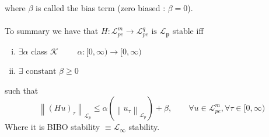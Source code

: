 \documentclass{article}
\begin{document}
where $\beta $ is called the bias term (zero biased : $\beta = 0$).
\\\\
To summary we have that $H : \mathcal{L}_{pe}^{m} \to \mathcal{L}_{pe}^{q} \text{ is } \mathbf{\mathcal{L}_p}$ stable iff 
\begin{enumerate}[i)]
	\item $\exists \alpha $ class $\mathcal{K}$ $\qquad \alpha : [0, \infty) \to [0, \infty) $
	\item $\exists \text{ constant } \beta  \geq 0$  
\end{enumerate} 
such that
\begin{equation}
	\left\| (Hu)_\tau  \right\|_{\mathcal{L}_p} \leq \alpha (\left\| u_\tau  \right\|_{\mathcal{L}_p}) + \beta, \qquad \forall u \in \mathcal{L}_{pe}^{m}, \forall \tau \in [0, \infty) 
\end{equation}
Where it is BIBO stability $\equiv \mathcal{L}_\infty $ stability.
\end{document}
